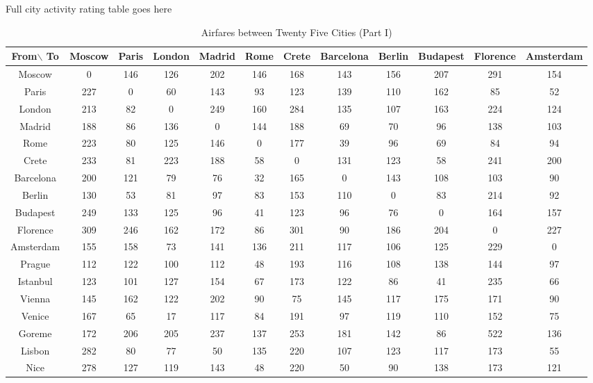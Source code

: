 \documentclass[12pt]{article}
\begin{document}
Full city activity rating table goes here

\pagebreak
\begin{landscape}
\begin{table}[h]
\caption{Airfares between Twenty Five Cities (Part I)}
\centering
\vspace{1mm}
\begin{tabular}{c|c|c|c|c|c|c|c|c|c|c|c}
\hline
\rule{0pt}{2ex} From$\backslash$ To & Moscow & Paris & London & Madrid & Rome & Crete & Barcelona & Berlin & Budapest & Florence & Amsterdam   \\
\hline
\rule{0pt}{2ex}Moscow & 0 & 146 & 126 & 202 & 146 & 168 & 143 & 156 & 207 & 291 & 154 \\
Paris & 227 & 0 & 60 & 143 & 93 & 123 & 139 & 110 & 162 & 85 & 52  \\
London & 213 & 82 & 0 & 249 & 160 & 284 & 135 & 107 & 163 & 224 & 124  \\
Madrid & 188 & 86 & 136 & 0 & 144 & 188 & 69 & 70 & 96 & 138 & 103  \\
Rome & 223 & 80 & 125 & 146 & 0 & 177 & 39 & 96 & 69 & 84 & 94  \\
Crete & 233 & 81 & 223 & 188 & 58 & 0 & 131 & 123 & 58 & 241 & 200 \\
Barcelona & 200 & 121 & 79 & 76 & 32 & 165 & 0 & 143 & 108 & 103 & 90 \\
Berlin & 130 & 53 & 81 & 97 & 83 & 153 & 110 & 0 & 83 & 214 & 92 \\
Budapest & 249 & 133 & 125 & 96 & 41 & 123 & 96 & 76 & 0 & 164 & 157 \\
Florence & 309 & 246 & 162 & 172 & 86 & 301 & 90 & 186 & 204 & 0 & 227 \\
Amsterdam & 155 & 158 & 73 & 141 & 136 & 211 & 117 & 106 & 125 & 229 & 0 \\
Prague & 112 & 122 & 100 & 112 & 48 & 193 & 116 & 108 & 138 & 144 & 97 \\
Istanbul & 123 & 101 & 127 & 154 & 67 & 173 & 122 & 86 & 41 & 235 & 66 \\
Vienna & 145 & 162 & 122 & 202 & 90 & 75 & 145 & 117 & 175 & 171 & 90 \\
Venice & 167 & 65 & 17 & 117 & 84 & 191 & 97 & 119 & 110 & 152 & 75 \\
Goreme & 172 & 206 & 205 & 237 & 137 & 253 & 181 & 142 & 86 & 522 & 136 \\
Lisbon & 282 & 80 & 77 & 50 & 135 & 220 & 107 & 123 & 117 & 173 & 55 \\
Nice & 278 & 127 & 119 & 143 & 48 & 220 & 50 & 90 & 138 & 173 & 121 \\

\end{tabular}
\end{table}
\end{landscape}
\end{document}

